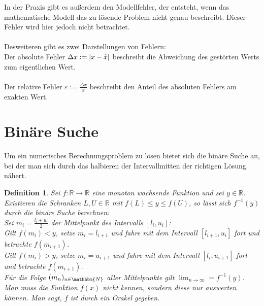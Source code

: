 \documentclass[12pt]{article}
\newcommand{\N}{\mathbbm{N}} %
\newcommand{\R}{\mathbb{R}} %
\newtheorem{definition}[satz]{Definition}
\begin{document}
\noindent In der Praxis gibt es außerdem den Modellfehler, der entsteht, wenn das mathematische Modell das zu lösende Problem nicht genau beschreibt. Dieser Fehler wird hier jedoch nicht betrachtet. \\ 
\\
Desweiteren gibt es zwei Darstellungen von Fehlern: \\
Der absolute Fehler $\Delta x:=|x- \Tilde{x}|$ beschreibt die Abweichung des gestörten Werts zum eigentlichen Wert. \\
\\
Der relative Fehler $\varepsilon:= \frac{\Delta x}{x}$ beschreibt den Anteil des absoluten Fehlers am exakten Wert. 

\newpage
\section{Binäre Suche}
Um ein numerisches Berechnungsproblem zu lösen bietet sich die binäre Suche an, bei der man sich durch das halbieren der Intervallmitten der richtigen Lösung nähert.
\begin{definition} 
   Sei $f: \R \to \R$ eine monoton wachsende Funktion und sei $y \in \R$. Existieren die Schranken $L,U \in \R$ mit $f(L) \leq y \leq f(U)$, so lässt sich $f^{-1}(y)$ durch die binäre Suche berechnen: \\
   Sei $m_i= \frac{l_i+u_i}{2}$ der Mittelpunkt des Intervalls $[l_i,u_i]$: \\
   Gilt $f(m_i)< y$, setze $m_i=l_{i+1}$ und fahre mit dem Intervall $[l_{i+1},u_i]$ fort und betrachte $f(m_{i+1})$. \\
   Gilt $f(m_i)>y$, setze $m_i=u_{i+1}$ und fahre mit dem Intervall $[l_i,u_{i+1}]$ fort und betrachte $f(m_{i+1})$. \\ 
   Für die Folge $(m_n)_{n \in \N}$ aller Mittelpunkte gilt $\lim_{n \to \infty} =f^{-1}(y)$.
   Man muss die Funktion $f(x)$ nicht kennen, sondern diese nur auswerten können. Man sagt, $f$ ist durch ein Orakel gegeben.
\end{definition}
\end{document}
